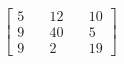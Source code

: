 \documentclass[preview]{standalone}
\begin{document}
\begin{align*}
\begin{bmatrix} 5 & \quad 12 & \quad 10 \\ 9 & \quad 40 & \quad 5 \\ 9 & \quad 2 & \quad 19 \end{bmatrix}
\end{align*}
\end{document}
